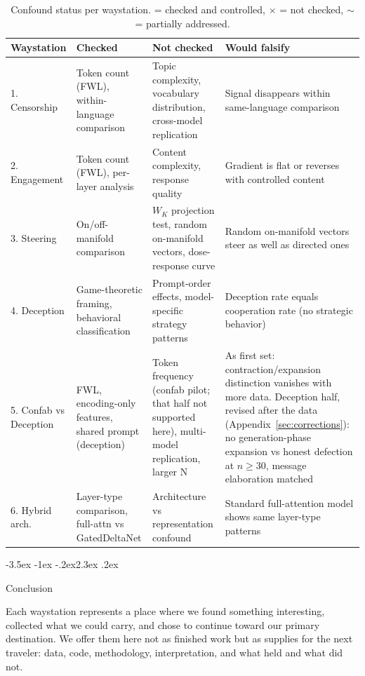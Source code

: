 \documentclass[11pt,a4paper]{article}
\makeatletter
\renewcommand\section{\@startsection{section}{1}{\z@}%
  {-3.5ex \@plus -1ex \@minus -.2ex}{2.3ex \@plus.2ex}%
  {\normalfont\Large\bfseries\raggedright}}
\makeatother
\begin{document}
\begin{table}[H]
\centering
\small
\caption{Confound status per waystation. \checkmark = checked and controlled,
$\times$ = not checked, $\sim$ = partially addressed.}
\label{tab:confounds}
\begin{tabular}{p{2.5cm}p{3.5cm}p{3.5cm}p{3cm}}
\toprule
Waystation & Checked & Not checked & Would falsify \\
\midrule
1. Censorship & Token count (FWL), within-language comparison &
  Topic complexity, vocabulary distribution, cross-model replication &
  Signal disappears within same-language comparison \\
\midrule
2. Engagement & Token count (FWL), per-layer analysis &
  Content complexity, response quality &
  Gradient is flat or reverses with controlled content \\
\midrule
3. Steering & On/off-manifold comparison &
  $W_K$ projection test, random on-manifold vectors, dose-response curve &
  Random on-manifold vectors steer as well as directed ones \\
\midrule
4. Deception & Game-theoretic framing, behavioral classification &
  Prompt-order effects, model-specific strategy patterns &
  Deception rate equals cooperation rate (no strategic behavior) \\
\midrule
5. Confab vs Deception & FWL, encoding-only features, shared prompt (deception) &
  Token frequency (confab pilot; that half not supported here), multi-model replication, larger N &
  As first set: contraction/expansion distinction vanishes with more data. Deception half, revised after the data (Appendix~\ref{sec:corrections}): no generation-phase expansion vs honest defection at $n \geq 30$, message elaboration matched \\
\midrule
6. Hybrid arch. & Layer-type comparison, full-attn vs GatedDeltaNet &
  Architecture vs representation confound &
  Standard full-attention model shows same layer-type patterns \\
\bottomrule
\end{tabular}
\end{table}

\section{Conclusion}

Each waystation represents a place where we found something
interesting, collected what we could carry, and chose to continue
toward our primary destination. We offer them here not as finished
work but as supplies for the next traveler: data, code, methodology,
interpretation, and what held and what did not.
\end{document}
